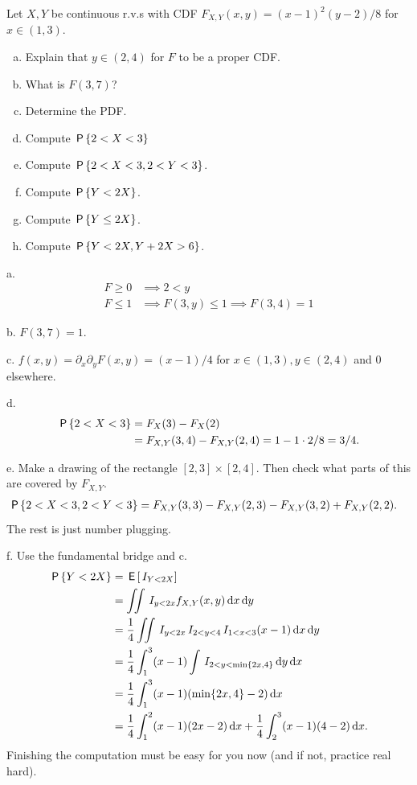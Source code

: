 \documentclass[assignments]{subfiles}
\begin{document}
\begin{exercise}
Let $X, Y$ be continuous r.v.s with CDF $F_{X,Y}(x,y) = (x-1)^{2}(y-2)/8$ for $x \in (1, 3)$.
\begin{enumerate}[a.]
\item Explain that $y\in (2,4)$ for  $F$ to be a proper CDF.
\item What is $F(3,7)$?
\item Determine the PDF.
\item Compute $\P{2< X < 3}$
\item Compute $\P{2< X < 3, 2<Y<3}$.
\item Compute $\P{Y< 2X}$.
\item Compute $\P{Y\leq  2X}$.
\item Compute $\P{Y< 2X, Y+2X > 6}$.
\end{enumerate}
\begin{solution}
a.
\begin{align}
\label{eq:11}
F \geq 0 &\implies 2<y\\
F \leq 1 &\implies F(3, y)\leq 1 \implies F(3,4)=1
\end{align}

b. $F(3,7) = 1$.

c. $f(x,y) = \partial_{x} \partial_{y} F(x,y) = (x-1)/4$ for $x\in(1,3), y\in(2,4)$ and $0$ elsewhere.

d.
\begin{align}
\P{2 < X < 3}
&= F_{X}(3) - F_{X}(2) \\
&= F_{X,Y}(3, 4) - F_{X,Y}(2,4) = 1 - 1\cdot 2/8 = 3/4.
\end{align}

e.
Make a drawing of the rectangle $[2,3]\times[2,4]$. Then check what parts of this are covered by $F_{X,Y}$.
\begin{align}
\P{2 < X < 3, 2 < Y < 3}
&= F_{X,Y}(3, 3) - F_{X,Y}(2,3)  - F_{X,Y}(3, 2) + F_{X,Y}(2,2).
\end{align}
The rest is just number plugging.


f.
Use the fundamental bridge and c.
\begin{align}
\P{Y< 2 X}
&= \E{\1{Y < 2 X}} \\
&= \iint \1{y < 2 x} f_{X,Y}(x,y) \d x \d y\\
&= \frac{1}{4}\iint \1{y < 2 x} \1{2< y <4} \1{1<x<3} (x-1) \d x \d y\\
&= \frac{1}{4}\int_{1}^{3} (x-1) \int \1{2<y < \min\{2 x,4\}}  \d y \d x \\
&= \frac{1}{4}\int_{1}^{3} (x-1) (\min\{2 x,4\}-2) \d x \\
&= \frac{1}{4}\int_{1}^{2} (x-1) (2 x-2) \d x
+ \frac{1}{4}\int_{2}^{3} (x-1) (4-2) \d x.
\end{align}
Finishing the computation must be easy for you now (and if not, practice real hard).


\end{solution}
\end{exercise}
\end{document}

